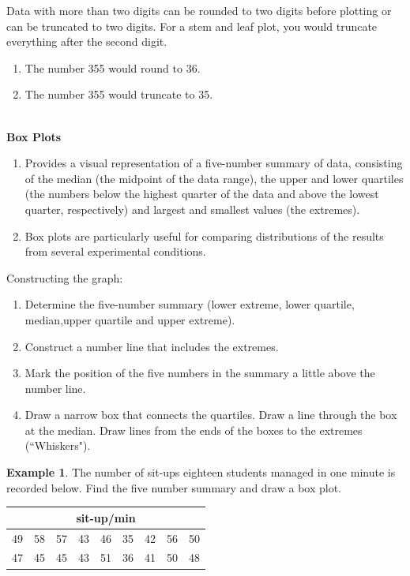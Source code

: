 \documentclass[11pt,a4paper]{article}
\theoremstyle{definition}
\newtheorem{example}[thm]{Example}
\begin{document}
Data with more than two digits can be rounded to two digits before plotting or can be truncated to two digits. For a stem and leaf plot, you would truncate everything after the second digit.
\begin{enumerate}
\item[$\bullet$] The number 355 would round to 36.
\item[$\bullet$] The number 355 would truncate to 35.\\[1ex]\\
\end{enumerate}





\textbf{Box Plots}
\begin{enumerate}
\item[$\bullet$] Provides a visual representation of a five-number summary of data, consisting of the median (the midpoint of the data range), the upper and lower quartiles (the numbers below the highest quarter of the data and above the lowest quarter, respectively) and largest and smallest values (the extremes).
\item[$\bullet$] Box plots are particularly useful for comparing distributions of the results from several experimental conditions.\\
\end{enumerate}








Constructing the graph:
\begin{enumerate}
\item[\textit{Step 1:}] Determine the five-number summary (lower extreme, lower quartile, median,upper quartile and upper extreme).
\item[\textit{Step 2:}] Construct a number line that includes the extremes.
\item[\textit{Step 3:}] Mark the position of the five numbers in the summary a little above the number line.
\item[\textit{Step 4:}] Draw a narrow box that connects the quartiles. Draw a line through the box at the median. Draw lines from the ends of the boxes to the extremes (``Whiskers").\\
\end{enumerate}






\begin{example}
The number of sit-ups eighteen students managed in one minute is recorded below.
Find the five number summary and draw a box plot.
\begin{table}[H]
\centering
\begin{tabular}{ccccccccc}
\multicolumn{9}{c}{sit-up/min}\\
\hline
49 & 58 & 57 & 43 & 46 & 35 & 42 & 56 & 50\\
47 & 45 & 45 & 43 & 51 & 36 & 41 & 50 & 48\\
\hline
\end{tabular}
\end{table}
\end{example}
\end{document}
